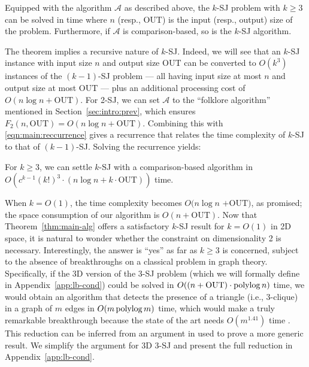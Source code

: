 \documentclass[sigconf]{acmart}
\def\A{\mathcal{A}}
\def\out{\mathrm{OUT}}
\begin{document}
\begin{theorem} \label{thm:main-recur}
    Equipped with the algorithm $\A$ as described above, the $k$-SJ problem with $k \ge 3$ can be solved in time
    \myeqn{
        O(k^3) \cdot \big( F_{k-1}(n, \out) + n \log n + k \cdot \out \big)
        \label{eqn:main:reccurrence}
    }
    where $n$ (resp., $\out$) is the input (resp., output) size of the problem. Furthermore, if $\A$ is comparison-based, so is the $k$-SJ algorithm.

\end{theorem}

The theorem implies a recursive nature of $k$-SJ. Indeed, we will see that an $k$-SJ instance with input size $n$ and output size $\out$ can be converted to $O(k^3)$ instances of the $(k-1)$-SJ problem --- all having input size at most $n$ and output size at most $\out$ --- plus an additional processing cost of $O(n \log n + \out)$. For 2-SJ, we can set $\A$  to the ``folklore algorithm'' mentioned in Section~\ref{sec:intro:prev}, which ensures $F_2(n, \out) = O(n \log n + \out)$. Combining this with \eqref{eqn:main:reccurrence} gives a recurrence that relates the time complexity of $k$-SJ to that of $(k-1)$-SJ. Solving the recurrence yields:

\begin{theorem} \label{thm:main-alg}
    For $k \ge 3$, we can settle $k$-SJ with a comparison-based algorithm in $O( c^{k-1} (k!)^3 \cdot (n \log n + k \cdot \out))$ time.
\end{theorem}

When $k = O(1)$, the time complexity becomes $O(n \log n$ $+ \out)$, as promised; the space consumption of our algorithm is $O(n + \out)$. Now that Theorem~\ref{thm:main-alg} offers a satisfactory $k$-SJ result for $k = O(1)$ in 2D space, it is natural to wonder whether the constraint on dimensionality 2 is necessary. Interestingly, the answer is ``yes'' as far as $k \ge 3$ is concerned, subject to the absence of breakthroughs on a classical problem in graph theory. Specifically, if the 3D version of the 3-SJ problem (which we will formally define in Appendix~\ref{app:lb-cond}) could be solved in $O((n + \out) \cdot \polylog n)$ time, we would obtain an algorithm that detects the presence of a triangle (i.e., 3-clique) in a graph of $m$ edges in $O(m \operatorname*{polylog} m)$ time, which would make a truly remarkable breakthrough because the state of the art needs $O(m^{1.41})$ time \cite{ayz97}. This reduction can be inferred from an argument in \cite{kcko22} used to prove a more generic result. We simplify the argument for 3D 3-SJ and present the full reduction in Appendix~\ref{app:lb-cond}.
\end{document}

